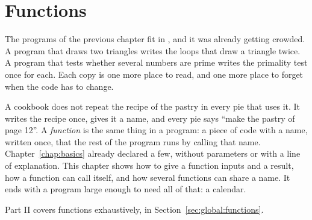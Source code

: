 \chapter{Functions}
\label{chap:functions}

The programs of the previous chapter fit in , and it was already
getting crowded. A program that draws two triangles writes the loops that draw a
triangle twice. A program that tests whether several numbers are prime writes
the primality test once for each. Each copy is one more place to read, and one
more place to forget when the code has to change.

A cookbook does not repeat the recipe of the pastry in every pie that uses it. It
writes the recipe once, gives it a name, and every pie says ``make the pastry of
page 12''. A \textit{function} is the same thing in a program: a piece of code
with a name, written once, that the rest of the program runs by calling that
name. Chapter~\ref{chap:basics} already declared a few, without parameters or
with a line of explanation. This chapter shows how to give a function inputs and
a result, how a function can call itself, and how several functions can share a
name. It ends with a program large enough to need all of that: a calendar.


Part II covers functions exhaustively, in
Section~\ref{sec:global:functions}.

\minitoc%








